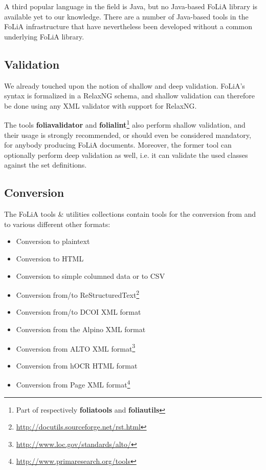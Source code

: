 \documentclass[a4paper,11pt]{article}
\begin{document}
A third popular language in the field is Java, but no Java-based FoLiA
library is available yet to our knowledge. There are a number of
Java-based tools in the FoLiA infrastructure that have nevertheless been developed
without a common underlying FoLiA library.

\subsection{Validation}

We already touched upon the notion of shallow and deep validation.
FoLiA's syntax is formalized in a RelaxNG schema, and shallow validation can
therefore be done using any XML validator with support for RelaxNG. 

The tools \textbf{foliavalidator} and \textbf{folialint}\footnote{Part of
respectively \textbf{foliatools} and \textbf{foliautils}} also perform shallow validation, and
their usage is strongly recommended, or should even be considered mandatory,
for anybody producing FoLiA documents. Moreover, the former tool can optionally perform
deep validation as well, i.e. it can validate the used classes against the set
definitions.

\subsection{Conversion}

The FoLiA tools \& utilities collections contain tools for the conversion from and to
various different other formats:

\begin{itemize}
    \item Conversion to plaintext
    \item Conversion to HTML
    \item Conversion to simple columned data or to CSV
    \item Conversion from/to ReStructuredText\footnote{\url{http://docutils.sourceforge.net/rst.html}}
    \item Conversion from/to DCOI XML format \cite{DCOI}
    \item Conversion from the Alpino XML format \cite{ALPINO}
    \item Conversion from ALTO XML format\footnote{\url{http://www.loc.gov/standards/alto/}}
    \item Conversion from hOCR HTML format  \cite{Breuel2007}
    \item Conversion from Page XML format\footnote{\url{http://www.primaresearch.org/tools}}
\end{itemize}
\end{document}
